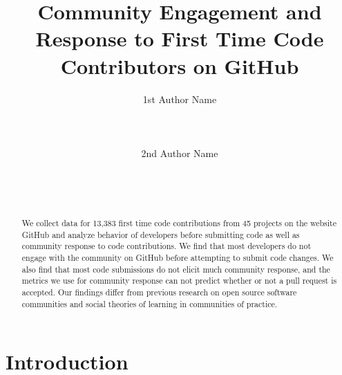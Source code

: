 \documentclass{sigchi}
\begin{document}
\title{Community Engagement and Response to First Time Code Contributors on 
GitHub}

\author{
  \alignauthor 1st Author Name\\
    \\
    \\
    \\
  \alignauthor 2nd Author Name\\
    \\
    \\
    \\
}

\maketitle                %



\begin{abstract}           %
We collect data for 13,383 first time code contributions from 45 projects on the
website GitHub and analyze behavior of developers before submitting code as well
as community response to code contributions. We find that most developers do not
engage with the community on GitHub before attempting to submit code changes. We
also find that most code submissions do not elicit much community response, and
the metrics we use for community response can not predict whether or not a pull
request is accepted. Our findings differ from previous research on open source
software communities and social theories of learning in communities of practice.
\end{abstract}

\section{Introduction}
\end{document}
